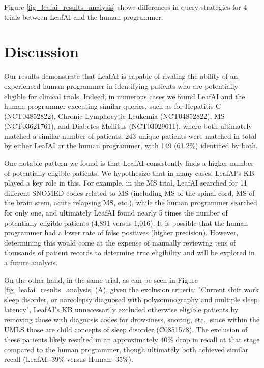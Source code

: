 \documentclass[../main.tex]{subfiles}
\begin{document}
Figure \ref{fig_leafai_results_analysis} shows differences in query strategies for 4 trials between LeafAI and the human programmer. 

\section{Discussion}

Our results demonstrate that LeafAI is capable of rivaling the ability of an experienced human programmer in identifying patients who are potentially eligible for  clinical trials. Indeed, in numerous cases we found LeafAI and the human programmer executing similar queries, such as for Hepatitis C (NCT04852822), Chronic Lymphocytic Leukemia (NCT04852822), MS (NCT03621761), and Diabetes Mellitus (NCT03029611), where both ultimately matched a similar number of patients. 243 unique patients were matched in total by either LeafAI or the human programmer, with 149 (61.2\%) identified by both.

One notable pattern we found is that LeafAI consistently finds a higher number of potentially eligible patients. We hypothesize that in many cases, LeafAI’s KB played a key role in this. For example, in the MS trial, LeafAI searched for 11 different SNOMED codes related to MS (including MS of the spinal cord, MS of the brain stem, acute relapsing MS, etc.), while the human programmer searched for only one, and ultimately LeafAI found nearly 5 times the number of potentially eligible patients (4,891 versus 1,016). It is possible that the human programmer had a lower rate of false positives (higher precision). However, determining this would come at the expense of manually reviewing tens of thousands of patient records to determine true eligibility and will be explored in a future analysis.  

On the other hand, in the same trial, as can be seen in Figure \ref{fig_leafai_results_analysis} (A), given the exclusion criteria: "Current shift work sleep disorder, or narcolepsy diagnosed with polysomnography and multiple sleep latency", LeafAI’s KB unnecessarily excluded otherwise eligible patients by removing those with diagnosis codes for drowsiness, snoring, etc., since within the UMLS those are child concepts of sleep disorder (C0851578). The exclusion of these patients likely resulted in an approximately 40\% drop in recall at that stage compared to the human programmer, though ultimately both achieved similar recall (LeafAI: 39\% versus Human: 35\%).
\end{document}

